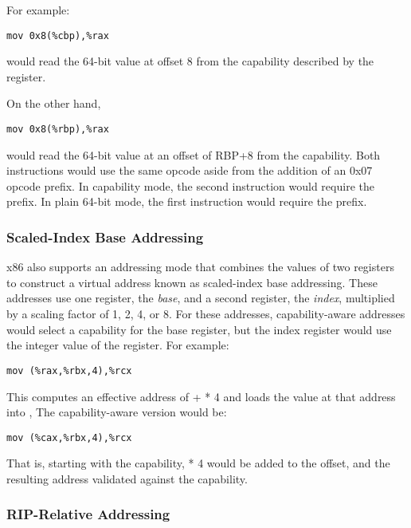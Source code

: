 For example:

\begin{verbatim}
mov 0x8(%cbp),%rax
\end{verbatim}

would read the 64-bit value at offset 8 from the capability described
by the \CBP{} register.

On the other hand,

\begin{verbatim}
mov 0x8(%rbp),%rax
\end{verbatim}

would read the 64-bit value at an offset of RBP+8 from the \DDC{} capability.
Both instructions would use the same opcode aside from the addition of
an 0x07 opcode prefix.  In capability mode, the second
instruction would require the prefix.  In plain 64-bit mode,
the first instruction would require the prefix.

\subsubsection{Scaled-Index Base Addressing}

x86 also supports an addressing mode that combines the values of two
registers to construct a virtual address known as scaled-index base
addressing.  These addresses use one register, the \emph{base}, and a
second register, the \emph{index}, multiplied by a scaling factor of 1, 2,
4, or 8.  For these addresses, capability-aware addresses would select
a capability for the base register, but the index register would use
the integer value of the register.  For example:

\begin{verbatim}
mov (%rax,%rbx,4),%rcx
\end{verbatim}

This computes an effective address of \RAX{} + \RBX{} * 4 and loads the value
at that address into \RCX{},  The capability-aware version would be:

\begin{verbatim}
mov (%cax,%rbx,4),%rcx
\end{verbatim}

That is, starting with the \CAX{} capability, \RBX{} * 4 would be added to the
offset, and the resulting address validated against the \CAX{} capability.

\subsubsection{RIP-Relative Addressing}

